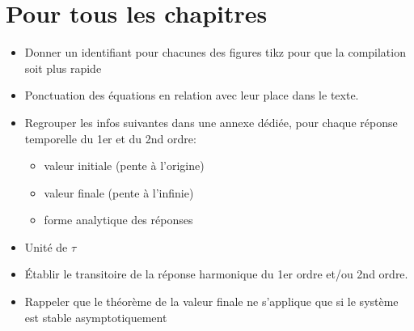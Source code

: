 \section*{Pour tous les chapitres}
\begin{itemize}
\item Donner un identifiant pour chacunes des figures tikz pour que la 
      compilation soit plus rapide
\item Ponctuation des équations en relation avec leur place dans le texte.
\item Regrouper les infos suivantes dans une annexe dédiée, pour chaque 
      réponse temporelle du 1er et du 2nd ordre:
    \begin{itemize}
        \item valeur initiale (pente à l'origine)
        \item valeur finale (pente à l'infinie)
        \item forme analytique des réponses
    \end{itemize}
\item Unité de $\tau$
\item \'Etablir le transitoire de la réponse harmonique du 1er ordre et/ou 
      2nd ordre.
\item Rappeler que le théorème de la valeur finale ne s'applique que si le 
      système est stable asymptotiquement
\end{itemize}

\section*{}     

